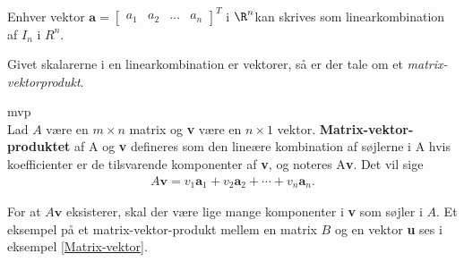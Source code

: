 Enhver vektor 
$
\textbf{a}=
\begin{bmatrix}
a_1 & a_2 & \ldots & a_n
\end{bmatrix}^T
$
i $\R^n$kan skrives som linearkombination af $I_n$ i $R^n$.


Givet skalarerne i en linearkombination er vektorer, så er der tale om et \textit{matrix-vektorprodukt}.

\begin{defn}{}{mvp}
\phantom{gdfs}\\Lad $A$ være en $m \times n$ matrix og \textbf{v} være en $n \times 1$ vektor. \textbf{Matrix-vektor-produktet} af A og \textbf{v} defineres som den lineære kombination af søjlerne i A hvis koefficienter er de tilsvarende komponenter af \textbf{v}, og noteres A\textbf{v}. Det vil sige
\begin{align*}
A\textbf{v} =v_1\textbf{a}_1 + v_2\textbf{a}_2 + \cdots + v_n\textbf{a}_n.
\end{align*}
\end{defn}
\noindent
For at $A\textbf{v}$ eksisterer, skal der være lige mange komponenter i \textbf{v} som søjler i $A$. Et eksempel på et matrix-vektor-produkt mellem en matrix $B$ og en vektor \textbf{u} ses i eksempel \ref{Matrix-vektor}.

